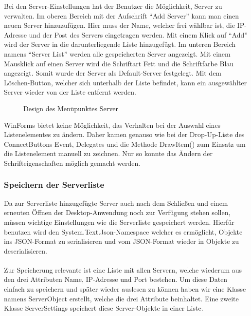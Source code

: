 Bei den Server-Einstellungen hat der Benutzer die Möglichkeit, Server zu verwalten.
Im oberen Bereich mit der Aufschrift “Add Server” kann man einen neuen Server hinzuzufügen. Hier muss der Name, welcher frei wählbar ist, die IP-Adresse und der Post des Servers eingetragen werden. Mit einem Klick auf “Add” wird der Server in die darunterliegende Liste hinzugefügt. Im unteren Bereich namens “Server List” werden alle gespeicherten Server angezeigt. Mit einem Mausklick auf einen Server wird die Schriftart Fett und die Schriftfarbe Blau angezeigt. Somit wurde der Server als Default-Server festgelegt. Mit dem Löschen-Button, welcher sich unterhalb der Liste befindet, kann ein ausgewählter Server wieder von der Liste entfernt werden.
\\
\begin{figure}[H]
    \centering
    \setlength{\fboxsep}{1pt}
	\setlength{\fboxrule}{1pt}
    \caption{Design des Menüpunktes Server} 
\end{figure}
\noindent
WinForms bietet keine Möglichkeit, das Verhalten bei der Auswahl eines Listenelementes zu ändern. Daher kamen genauso wie bei der Drop-Up-Liste des ConnectButtons Event, Delegates und die Methode DrawItem() zum Einsatz um die Listenelement manuell zu zeichnen. Nur so konnte das Ändern der Schrifteigenschaften möglich gemacht werden.

\subsubsection{Speichern der Serverliste}
Da zur Serverliste hinzugefügte Server auch nach dem Schließen und einem erneuten Öffnen der Desktop-Anwendung noch zur Verfügung stehen sollen, müssen wichtige Einstellungen wie die Serverliste gespeichert werden. Hierfür benutzen wird den System.Text.Json-Namespace welcher es ermöglicht, Objekte ins JSON-Format zu serialisieren und vom JSON-Format wieder in Objekte zu deserialisieren.
\\ \ \\
Zur Speicherung relevante ist eine Liste mit allen Servern, welche wiederum aus den drei Attributen Name, IP-Adresse und Port bestehen. Um diese Daten einfach zu speichern und später wieder auslesen zu können haben wir eine Klasse namens ServerObject erstellt, welche die drei Attribute beinhaltet. Eine zweite Klasse ServerSettings speichert diese Server-Objekte in einer Liste.

